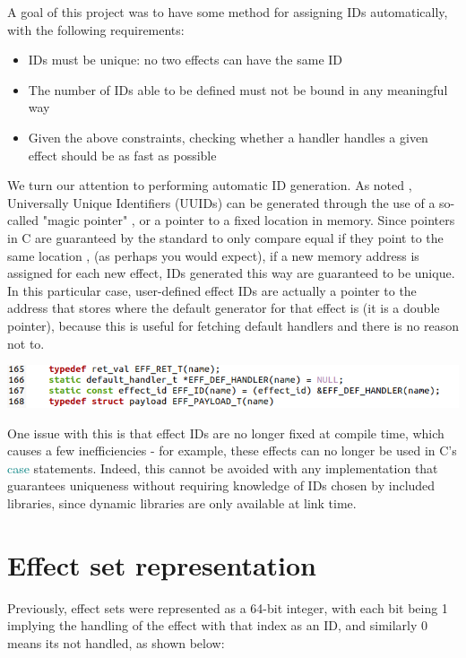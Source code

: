 \documentclass[logo,bsc,singlespacing,parskip,online]{infthesis}
\begin{document}
A goal of this project was to have some method for assigning IDs automatically, with the following requirements:

\begin{itemize}
\item IDs must be unique: no two effects can have the same ID
\item The number of IDs able to be defined must not be bound in any meaningful way
\item Given the above constraints, checking whether a handler handles a given effect should be as fast as possible
\end{itemize}

We turn our attention to performing automatic ID generation. As noted%
, Universally Unique Identifiers (UUIDs) can be generated through the use of a so-called "magic pointer"%
, or a pointer to a fixed location in memory. Since pointers in C are guaranteed by the standard to only compare equal if they point to the same location%
, (as perhaps you would expect), if a new memory address is assigned for each new effect, IDs generated this way are guaranteed to be unique. In this particular case, user-defined effect IDs are actually a pointer to the address that stores where the default generator for that effect is (it is a double pointer), because this is useful for fetching default handlers and there is no reason not to.

\includegraphics[scale=0.7]{ID_def_code.png}

One issue with this is that effect IDs are no longer fixed at compile time, which causes a few inefficiencies - for example, these effects can no longer be used in C's \textcolor{teal}{case} statements. Indeed, this cannot be avoided with any implementation that guarantees uniqueness without requiring knowledge of IDs chosen by included libraries, since dynamic libraries are only available at link time.

\section{Effect set representation}

Previously, effect sets were represented as a 64-bit integer, with each bit being 1 implying the handling of the effect with that index as an ID, and similarly 0 means its not handled, as shown below: 
\end{document}
